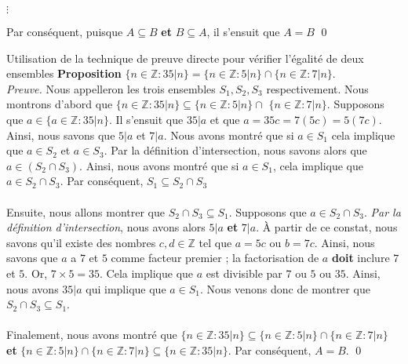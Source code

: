 \documentclass[16pt]{report}
\begin{document}
\begin{multicols*}{2}
\begin{center}
{{                    \hspace{1em} \(\vdots\) %

                    \vspace{0.5em} %
                    \noindent Par conséquent, puisque $A \subseteq B$ \textbf{et} $B \subseteq A$, il s'ensuit que 
                    $A = B$ \qed 
                }%
            }
            \end{center}


            \begin{Preuve}{Utilisation de la technique de preuve directe pour vérifier l'égalité de deux ensembles}{}
                \textbf{Proposition} \quad $\{ n \in \mathbb{Z}: 35|n \} = \{ n \in \mathbb{Z}: 5|n \} \cap 
                \{ n \in \mathbb{Z}: 7|n \}$.
                \vspace{1em}\\ 
                \textit{Preuve.} \quad Nous appelleron les trois ensembles $S_1, S_2, S_3$ respectivement. 
                Nous montrons d'abord que 
                $\{ n \in \mathbb{Z}: 35|n \} \subseteq \{ n \in \mathbb{Z}: 5|n \} \cap$ 
                $\{ n \in \mathbb{Z} : 7|n \}$. Supposons que $a \in \{ a \in \mathbb{Z} : 35|n \}$. Il s'ensuit que 
                $35|a$ et que $ a = 35c = 7(5c) = 5(7c)$. Ainsi, nous savons que $5|a$ et $7|a$. Nous avons 
                montré que si $a \in S_1$ cela implique que $a \in S_2$ et $a \in S_3$. 
                Par la définition d'intersection,
                nous savons alors que $a \in (S_2 \cap S_3)$. Ainsi, nous avons montré que si $a \in S_1$, 
                cela implique que $a \in S_2 \cap S_3$. Par conséquent, $S_1 \subseteq S_2\cap S_3$
                \\\\
                \quad Ensuite, nous allons montrer que $S_2 \cap S_3 \subseteq S_1$. 
                Supposons que $a \in S_2 \cap S_3$.
                \textit{Par la définition d'intersection}, nous avons   
                alors $5|a$ \textbf{et} $7|a$. À partir de ce constat, nous savons qu'il existe des 
                nombres $c, d\in \mathbb{Z}$ tel que $a = 5c$ ou $b = 7c$. Ainsi, nous savons que $a$ a 
                $7$ et $5$ comme facteur premier ; la factorisation de $a$ \textbf{doit} inclure $7$ et $5$. 
                Or, $7 \times 5 = 35$. Cela implique que $a$ est divisible par $7$ ou $5$ ou $35$. Ainsi, 
                nous avons $35|a$ qui implique que $a \in S_1$. Nous venons donc de montrer que 
                $S_2 \cap S_3 \subseteq S_1$. 
                \\\\
                Finalement, nous avons montré que $\{ n \in \mathbb{Z}: 35|n \} \subseteq 
                \{ n \in \mathbb{Z}: 5|n \} \cap \{ n \in \mathbb{Z}: 7|n \}$ \textbf{et} 
                $\{ n \in \mathbb{Z}: 5|n \} \cap 
                \{ n \in \mathbb{Z}: 7|n \} \subseteq \{ n \in \mathbb{Z}: 35|n \} $.
                Par conséquent, $A = B$. \qed 
            \end{Preuve}



\end{multicols*}
\end{document}
